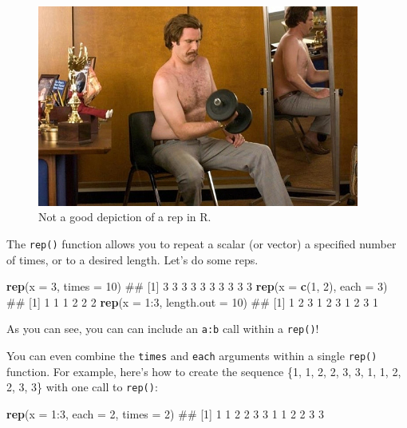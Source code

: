 \documentclass[]{book}
\newenvironment{Shaded}{\begin{snugshade}}{\end{snugshade}}
\newcommand{\KeywordTok}[1]{\textcolor[rgb]{0.13,0.29,0.53}{\textbf{{#1}}}}
\newcommand{\DataTypeTok}[1]{\textcolor[rgb]{0.13,0.29,0.53}{{#1}}}
\newcommand{\DecValTok}[1]{\textcolor[rgb]{0.00,0.00,0.81}{{#1}}}
\newcommand{\NormalTok}[1]{{#1}}
\theoremstyle{definition}
\theoremstyle{definition}
\theoremstyle{remark}
\begin{document}
\begin{figure}

{\centering \includegraphics[width=400px]{images/rep} 

}

\caption{Not a good depiction of a rep in R.}\label{fig:rep}
\end{figure}

The \texttt{rep()} function allows you to repeat a scalar (or vector) a
specified number of times, or to a desired length. Let's do some reps.

\begin{Shaded}
\begin{Highlighting}[]
\KeywordTok{rep}\NormalTok{(}\DataTypeTok{x =} \DecValTok{3}\NormalTok{, }\DataTypeTok{times =} \DecValTok{10}\NormalTok{)}
\NormalTok{##  [1] 3 3 3 3 3 3 3 3 3 3}
\KeywordTok{rep}\NormalTok{(}\DataTypeTok{x =} \KeywordTok{c}\NormalTok{(}\DecValTok{1}\NormalTok{, }\DecValTok{2}\NormalTok{), }\DataTypeTok{each =} \DecValTok{3}\NormalTok{)}
\NormalTok{## [1] 1 1 1 2 2 2}
\KeywordTok{rep}\NormalTok{(}\DataTypeTok{x =} \DecValTok{1}\NormalTok{:}\DecValTok{3}\NormalTok{, }\DataTypeTok{length.out =} \DecValTok{10}\NormalTok{)}
\NormalTok{##  [1] 1 2 3 1 2 3 1 2 3 1}
\end{Highlighting}
\end{Shaded}

As you can see, you can can include an \texttt{a:b} call within a
\texttt{rep()}!

You can even combine the \texttt{times} and \texttt{each} arguments
within a single \texttt{rep()} function. For example, here's how to
create the sequence \{1, 1, 2, 2, 3, 3, 1, 1, 2, 2, 3, 3\} with one call
to \texttt{rep()}:

\begin{Shaded}
\begin{Highlighting}[]
\KeywordTok{rep}\NormalTok{(}\DataTypeTok{x =} \DecValTok{1}\NormalTok{:}\DecValTok{3}\NormalTok{, }\DataTypeTok{each =} \DecValTok{2}\NormalTok{, }\DataTypeTok{times =} \DecValTok{2}\NormalTok{)}
\NormalTok{##  [1] 1 1 2 2 3 3 1 1 2 2 3 3}
\end{Highlighting}
\end{Shaded}
\end{document}
